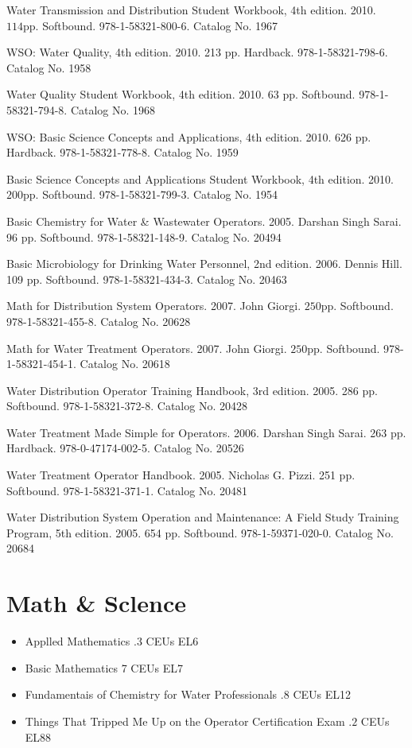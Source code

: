 \documentclass[10pt]{article}
\begin{document}
Water Transmission and Distribution Student Workbook, 4th edition. 2010. $114 \mathrm{pp}$. Softbound. 978-1-58321-800-6. Catalog No. 1967

WSO: Water Quality, 4th edition. 2010. 213 pp. Hardback. 978-1-58321-798-6. Catalog No. 1958

Water Quality Student Workbook, 4th edition. 2010. 63 pp. Softbound. 978-1-58321-794-8. Catalog No. 1968

WSO: Basic Science Concepts and Applications, 4th edition. 2010. 626 pp. Hardback. 978-1-58321-778-8. Catalog No. 1959

Basic Science Concepts and Applications Student Workbook, 4th edition. 2010. $200 \mathrm{pp}$. Softbound. 978-1-58321-799-3. Catalog No. 1954

Basic Chemistry for Water \& Wastewater Operators. 2005. Darshan Singh Sarai. 96 pp. Softbound. 978-1-58321-148-9. Catalog No. 20494

Basic Microbiology for Drinking Water Personnel, 2nd edition. 2006. Dennis Hill. 109 pp. Softbound. 978-1-58321-434-3. Catalog No. 20463

Math for Distribution System Operators. 2007. John Giorgi. $250 \mathrm{pp}$. Softbound. 978-1-58321-455-8. Catalog No. 20628

Math for Water Treatment Operators. 2007. John Giorgi. $250 \mathrm{pp}$. Softbound. 978-1-58321-454-1. Catalog No. 20618

Water Distribution Operator Training Handbook, 3rd edition. 2005. 286 pp. Softbound. 978-1-58321-372-8. Catalog No. 20428

Water Treatment Made Simple for Operators. 2006. Darshan Singh Sarai. 263 pp. Hardback. 978-0-47174-002-5. Catalog No. 20526

Water Treatment Operator Handbook. 2005. Nicholas G. Pizzi. 251 pp. Softbound. 978-1-58321-371-1. Catalog No. 20481

Water Distribution System Operation and Maintenance: A Field Study Training Program, 5th edition. 2005. 654 pp. Softbound. 978-1-59371-020-0. Catalog No. 20684

\section{Math \& Sclence}
\begin{itemize}
  \item Applled Mathematics .3 CEUs EL6

  \item Basic Mathematics 7 CEUs EL7

  \item Fundamentais of Chemistry for Water Professionals $.8$ CEUs EL12

  \item Things That Tripped Me Up on the Operator Certification Exam $.2$ CEUs EL88

\end{itemize}
\end{document}
